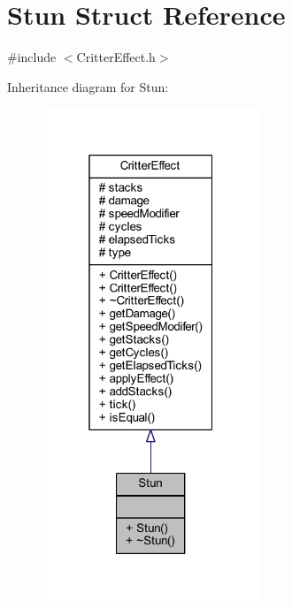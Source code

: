 \hypertarget{struct_stun}{\section{Stun Struct Reference}
\label{struct_stun}
}


{\ttfamily \#include $<$Critter\+Effect.\+h$>$}



Inheritance diagram for Stun\+:
\nopagebreak
\begin{figure}[H]
\begin{center}
\leavevmode
\includegraphics[width=184pt]{struct_stun__inherit__graph}
\end{center}
\end{figure}


